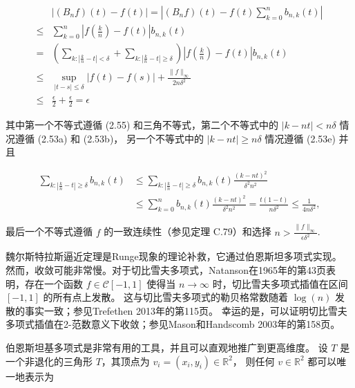 \documentclass[a4paper]{ctexart}
\begin{document}
{\begin{align*}
& \left| \left( B_n f \right)(t) - f(t) \right| = \left| \left( B_n f \right)(t) - f(t) \sum_{k=0}^n b_{n, k}(t) \right| \\
\leq & \sum_{k=0}^n \left| f\left( \frac{k}{n} \right) - f(t) \right| b_{n, k}(t) \\
= & \left( \sum_{k: \left| \frac{k}{n} - t \right| < \delta} + \sum_{k: \left| \frac{k}{n} - t \right| \geq \delta} \right) \left| f\left( \frac{k}{n} \right) - f(t) \right| b_{n, k}(t) \\
\leq & \sup_{|t-s| \leq \delta} \left| f(t) - f(s) \right| + \frac{\| f \|_{\infty}}{2 n \delta^2} \\
\leq & \frac{\epsilon}{2} + \frac{\epsilon}{2} = \epsilon
\end{align*}

其中第一个不等式遵循 (2.55) 和三角不等式，第二个不等式中的 \( |k - n t| < n \delta \) 情况遵循 (2.53a) 和 (2.53b)，
另一个不等式中的 \( |k - n t| \geq n \delta \) 情况遵循 (2.53e) 并且

\begin{align*}
\sum_{k: \left| \frac{k}{n} - t \right| \geq \delta} b_{n, k}(t) 
& \leq \sum_{k: \left| \frac{k}{n} - t \right| \geq \delta} b_{n, k}(t) \frac{(k - n t)^{2}}{\delta^{2} n^{2}} \\
& \leq \sum_{k=0}^{n} b_{n, k}(t) \frac{(k - n t)^{2}}{\delta^{2} n^{2}} = \frac{t(1-t)}{n \delta^{2}} \leq \frac{1}{4 n \delta^{2}},
\end{align*}

最后一个不等式遵循 \(f\) 的一致连续性（参见定理 C.79）和选择 \( n > \frac{\| f \|_{\infty}}{\epsilon \delta^{2}} \).

 魏尔斯特拉斯逼近定理是Runge现象的理论补救，它通过伯恩斯坦多项式实现。
然而，收敛可能非常慢。对于切比雪夫多项式，Natanson在1965年的第43页表明，存在一个函数 \( f \in \mathcal{C}[-1,1] \) 
使得当 \( n \rightarrow \infty \) 时，切比雪夫多项式插值在区间 \([-1,1]\) 的所有点上发散。
这与切比雪夫多项式的勒贝格常数随着 \( \log(n) \) 发散的事实一致；参见Trefethen 2013年的第115页。
幸运的是，可以证明切比雪夫多项式插值在2-范数意义下收敛；参见Mason和Handscomb 2003年的第158页。

 伯恩斯坦基多项式是非常有用的工具，并且可以直观地推广到更高维度。
设 \( T \) 是一个非退化的三角形 \( T \)，其顶点为 \( v_{i} = \left(x_{i}, y_{i}\right) \in \mathbb{R}^{2} \)，
则任何 \( v \in \mathbb{R}^{2} \) 都可以唯一地表示为

}
\end{document}
